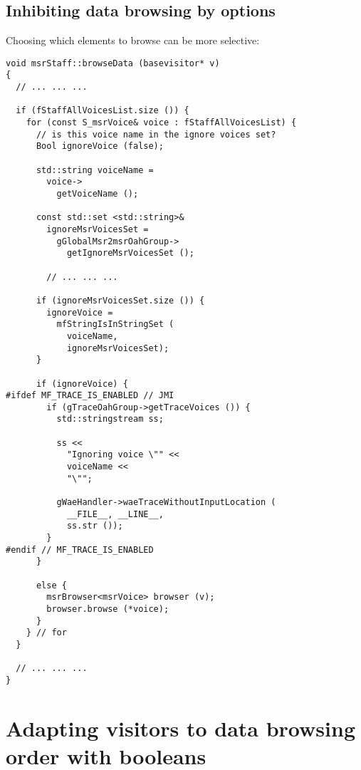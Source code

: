 \subsection{Inhibiting data browsing by options}

Choosing which elements to browse can be more selective:
\begin{lstlisting}[language=Terminal]
void msrStaff::browseData (basevisitor* v)
{
  // ... ... ...

  if (fStaffAllVoicesList.size ()) {
    for (const S_msrVoice& voice : fStaffAllVoicesList) {
      // is this voice name in the ignore voices set?
      Bool ignoreVoice (false);

      std::string voiceName =
        voice->
          getVoiceName ();

      const std::set <std::string>&
        ignoreMsrVoicesSet =
          gGlobalMsr2msrOahGroup->
            getIgnoreMsrVoicesSet ();

  		// ... ... ...

      if (ignoreMsrVoicesSet.size ()) {
        ignoreVoice =
          mfStringIsInStringSet (
            voiceName,
            ignoreMsrVoicesSet);
      }

      if (ignoreVoice) {
#ifdef MF_TRACE_IS_ENABLED // JMI
        if (gTraceOahGroup->getTraceVoices ()) {
          std::stringstream ss;

          ss <<
            "Ignoring voice \"" <<
            voiceName <<
            "\"";

          gWaeHandler->waeTraceWithoutInputLocation (
            __FILE__, __LINE__,
            ss.str ());
        }
#endif // MF_TRACE_IS_ENABLED
      }

      else {
        msrBrowser<msrVoice> browser (v);
        browser.browse (*voice);
      }
    } // for
  }

  // ... ... ...
}
\end{lstlisting}

\section{Adapting visitors to data browsing order with booleans}

